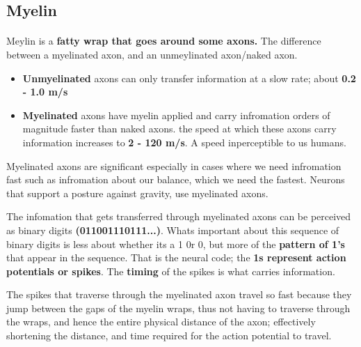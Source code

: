 \documentclass[12pt, a4paper]{article}
\begin{document}
\subsection{Myelin}
\paragraph*{}
Meylin is a \textbf{fatty wrap that goes around some axons.} The difference between a myelinated axon, and an
unmeylinated axon/naked axon.
\begin{itemize}
    \item \textbf{Unmyelinated} axons can only transfer information at a slow rate; about
    \textbf{0.2 - 1.0 m/s}
    \item \textbf{Myelinated} axons have myelin applied and carry infromation orders of magnitude faster than naked axons.
    the speed at which these axons carry information increases to \textbf{2 - 120 m/s}. A speed inperceptible to us humans.
\end{itemize}
Myelinated axons are significant especially in cases where we need infromation fast such as infromation about our balance, which we need the fastest. Neurons
that support a posture against gravity, use myelinated axons.

The infomation that gets transferred through myelinated axons can be perceived as binary digits
\textbf{(011001110111...)}. Whats important about this sequence of binary digits is less about whether its a 1 0r 0, but 
more of the \textbf{pattern of 1's} that appear in the sequence. That is the neural code; the \textbf{1s represent
action potentials or spikes}. The \textbf{timing} of the spikes is what carries information.

The spikes that traverse through the myelinated axon travel so fast because they jump between the gaps of
the myelin wraps, thus not having to traverse through the wraps, and hence the entire physical
distance of the axon; effectively shortening the distance, and time required for the action potential to travel.
\\
\end{document}
